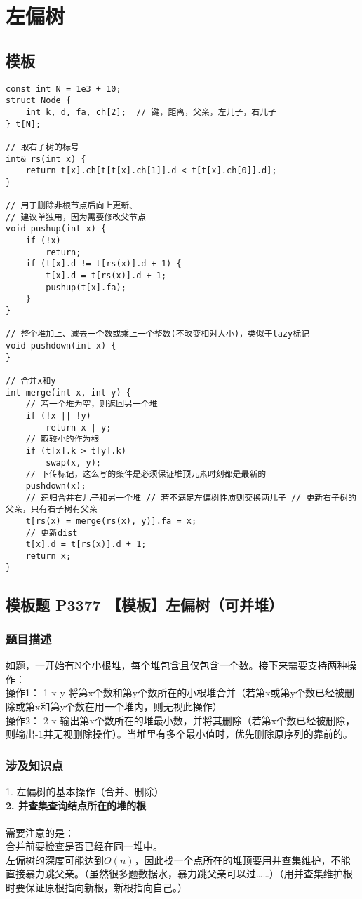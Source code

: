 \section{左偏树}
	\subsection{模板}	
\begin{lstlisting}
const int N = 1e3 + 10;
struct Node {
    int k, d, fa, ch[2];  // 键，距离，父亲，左儿子，右儿子
} t[N];

// 取右子树的标号
int& rs(int x) {
    return t[x].ch[t[t[x].ch[1]].d < t[t[x].ch[0]].d];
}

// 用于删除非根节点后向上更新、
// 建议单独用，因为需要修改父节点
void pushup(int x) {
    if (!x)
        return;
    if (t[x].d != t[rs(x)].d + 1) {
        t[x].d = t[rs(x)].d + 1;
        pushup(t[x].fa);
    }
}

// 整个堆加上、减去一个数或乘上一个整数(不改变相对大小)，类似于lazy标记
void pushdown(int x) {
}

// 合并x和y
int merge(int x, int y) {
    // 若一个堆为空，则返回另一个堆
    if (!x || !y)
        return x | y;
    // 取较小的作为根
    if (t[x].k > t[y].k)
        swap(x, y);
    // 下传标记，这么写的条件是必须保证堆顶元素时刻都是最新的
    pushdown(x);
    // 递归合并右儿子和另一个堆 // 若不满足左偏树性质则交换两儿子 // 更新右子树的父亲，只有右子树有父亲
    t[rs(x) = merge(rs(x), y)].fa = x;
    // 更新dist
    t[x].d = t[rs(x)].d + 1;
    return x;
}
\end{lstlisting}

	\subsection{模板题 P3377 【模板】左偏树（可并堆）}
		\subsubsection{题目描述}
			如题，一开始有N个小根堆，每个堆包含且仅包含一个数。接下来需要支持两种操作：\\
			操作1： 1 x y 将第x个数和第y个数所在的小根堆合并（若第x或第y个数已经被删除或第x和第y个数在用一个堆内，则无视此操作）\\
			操作2： 2 x 输出第x个数所在的堆最小数，并将其删除（若第x个数已经被删除，则输出-1并无视删除操作）。当堆里有多个最小值时，优先删除原序列的靠前的。
		\subsubsection{涉及知识点}
			1. 左偏树的基本操作（合并、删除）\\
			\textbf{2. 并查集查询结点所在的堆的根}\\\\
			需要注意的是：\\
			合并前要检查是否已经在同一堆中。\\
			左偏树的深度可能达到$O(n)$，因此找一个点所在的堆顶要用并查集维护，不能直接暴力跳父亲。（虽然很多题数据水，暴力跳父亲可以过……）（用并查集维护根时要保证原根指向新根，新根指向自己。）

